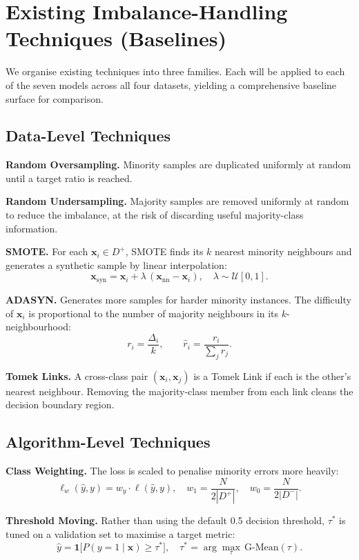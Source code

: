\documentclass[11pt,a4paper]{article}
\newcommand{\Dplus}{D^{+}}
\newcommand{\Dminus}{D^{-}}
\begin{document}
\section{Existing Imbalance-Handling Techniques (Baselines)}

We organise existing techniques into three families. Each will be applied to each of the seven
models across all four datasets, yielding a comprehensive baseline surface for comparison.

\subsection{Data-Level Techniques}

\textbf{Random Oversampling.} Minority samples are duplicated uniformly at random until a
target ratio is reached.

\textbf{Random Undersampling.} Majority samples are removed uniformly at random to reduce
the imbalance, at the risk of discarding useful majority-class information.

\textbf{SMOTE.} For each $\mathbf{x}_i \in \Dplus$, SMOTE finds its $k$ nearest minority
neighbours and generates a synthetic sample by linear interpolation:
\[
  \mathbf{x}_{\mathrm{syn}} = \mathbf{x}_i + \lambda\,(\mathbf{x}_{\mathrm{nn}} - \mathbf{x}_i),
  \quad \lambda \sim \mathcal{U}[0,1].
\]

\textbf{ADASYN.} Generates more samples for harder minority instances. The difficulty of
$\mathbf{x}_i$ is proportional to the number of majority neighbours in its $k$-neighbourhood:
\[
  r_i = \frac{\Delta_i}{k}, \qquad \hat{r}_i = \frac{r_i}{\sum_j r_j}.
\]

\textbf{Tomek Links.} A cross-class pair $(\mathbf{x}_i, \mathbf{x}_j)$ is a Tomek Link if
each is the other's nearest neighbour. Removing the majority-class member from each link
cleans the decision boundary region.

\subsection{Algorithm-Level Techniques}

\textbf{Class Weighting.} The loss is scaled to penalise minority errors more heavily:
\[
  \ell_w(\hat{y}, y) = w_y \cdot \ell(\hat{y}, y), \quad
  w_1 = \frac{N}{2|\Dplus|}, \quad w_0 = \frac{N}{2|\Dminus|}.
\]

\textbf{Threshold Moving.} Rather than using the default 0.5 decision threshold, $\tau^*$ is
tuned on a validation set to maximise a target metric:
\[
  \hat{y} = \mathbf{1}\!\bigl[P(y=1\mid\mathbf{x}) \ge \tau^*\bigr], \quad
  \tau^* = \arg\max_\tau\, \mathrm{G\text{-}Mean}(\tau).
\]
\end{document}
